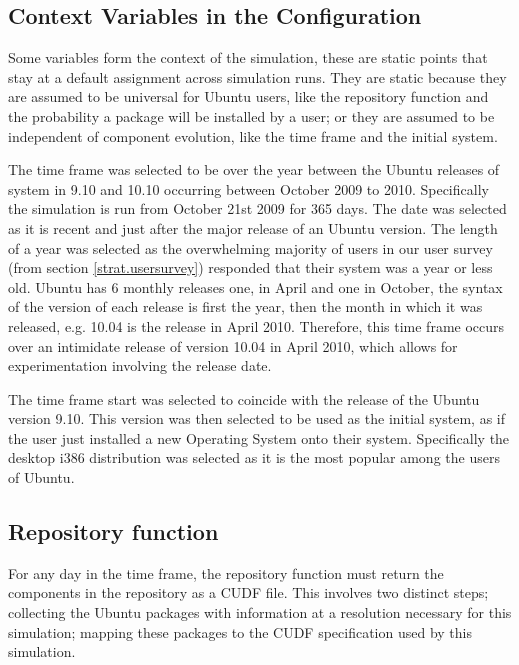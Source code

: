 \subsection{Context Variables in the Configuration}
Some variables form the context of the simulation, these are static points that stay at a default assignment across simulation runs.
They are static because they are assumed to be universal for Ubuntu users, like the repository function and the probability a package will be installed by a user;
or they are assumed to be independent of component evolution, like the time frame and the initial system.

The time frame was selected to be over the year between the Ubuntu releases of system in 9.10 and 10.10 occurring between October 2009 to 2010.
Specifically the simulation is run from October 21st 2009 for 365 days.
The date was selected as it is recent and just after the major release of an Ubuntu version.
The length of a year was selected as the overwhelming majority of users in our user survey (from section \ref{strat.usersurvey}) responded that their system was a year or less old.
Ubuntu has 6 monthly releases one, in April and one in October, the syntax of the version of each release is first the year,
then the month in which it was released, e.g. 10.04 is the release in April 2010.
Therefore, this time frame occurs over an intimidate release of version 10.04 in April 2010, which allows for experimentation involving the release date.

The time frame start was selected to coincide with the release of the Ubuntu version 9.10.
This version was then selected to be used as the initial system, as if the user just installed a new Operating System onto their system.
Specifically the desktop i386 distribution was selected as it is the most popular among the users of Ubuntu.

\subsection{Repository function}
For any day in the time frame, the repository function must return the components in the repository as a CUDF file.
This involves two distinct steps; collecting the Ubuntu packages with information at a resolution necessary for this simulation;
mapping these packages to the CUDF specification used by this simulation.

